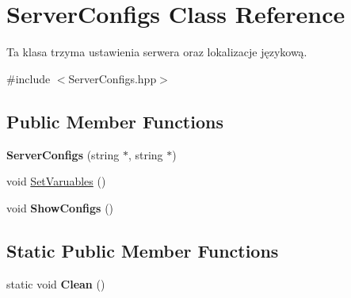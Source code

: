 \hypertarget{classServerConfigs}{
\section{ServerConfigs Class Reference}
\label{classServerConfigs}
}


Ta klasa trzyma ustawienia serwera oraz lokalizacje językową.  




{\ttfamily \#include $<$ServerConfigs.hpp$>$}

\subsection*{Public Member Functions}
\begin{DoxyCompactItemize}
\item 
\hypertarget{classServerConfigs_a43fcad67198113bd7160841e95a302c1}{
{\bfseries ServerConfigs} (string $\ast$, string $\ast$)}
\label{classServerConfigs_a43fcad67198113bd7160841e95a302c1}

\item 
void \hyperlink{classServerConfigs_a79b1527bcb676e9f100ea5c2bc5849a3}{SetVaruables} ()
\item 
\hypertarget{classServerConfigs_aa571c2b65a26a2b872d3d8cbdd351b38}{
void {\bfseries ShowConfigs} ()}
\label{classServerConfigs_aa571c2b65a26a2b872d3d8cbdd351b38}

\end{DoxyCompactItemize}
\subsection*{Static Public Member Functions}
\begin{DoxyCompactItemize}
\item 
\hypertarget{classServerConfigs_ada5336549c853844928049dc5a5aedbc}{
static void {\bfseries Clean} ()}
\label{classServerConfigs_ada5336549c853844928049dc5a5aedbc}

\end{DoxyCompactItemize}
